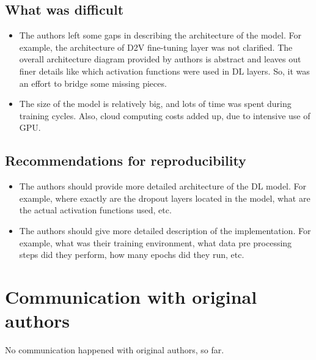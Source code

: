 \documentclass[11pt,a4paper]{article}
\begin{document}
\subsection{What was difficult}
\begin{itemize}
	\item The authors left some gaps in describing the architecture of the model. For example, the architecture of D2V fine-tuning layer was not clarified. The overall architecture diagram provided by authors is abstract and leaves out finer details like which activation functions were used in DL layers. So, it was an effort to bridge some missing pieces.
	\item The size of the model is relatively big, and lots of time was spent during training cycles. Also, cloud computing costs added up, due to intensive use of GPU.
\end{itemize}

\subsection{Recommendations for reproducibility}
\begin{itemize}
	\item The authors should provide more detailed architecture of the DL model. For example, where exactly are the dropout layers located in the model, what are the actual activation functions used, etc.
	\item The authors should give more detailed description of the implementation. For example, what was their training environment, what data pre processing steps did they perform, how many epochs did they run, etc.
\end{itemize}


\section{Communication with original authors}

No communication happened with original authors, so far.





\end{document}
